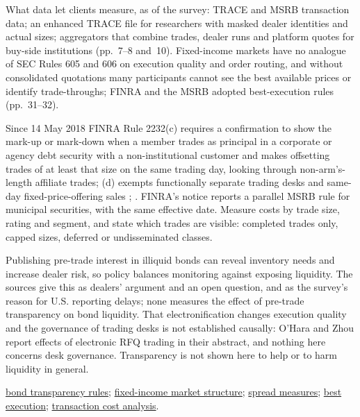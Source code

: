 \begin{qfevidence}
 What data let clients measure, as of the survey: TRACE and MSRB transaction data; an enhanced TRACE file for researchers with masked dealer identities and actual sizes; aggregators that combine trades, dealer runs and platform quotes for buy-side institutions (pp.~7--8 and~10). Fixed-income markets have no analogue of SEC Rules 605 and 606 on execution quality and order routing, and without consolidated quotations many participants cannot see the best available prices or identify trade-throughs; FINRA and the MSRB adopted best-execution rules (pp.~31--32).

Since 14 May 2018 FINRA Rule 2232(c) requires a confirmation to show the mark-up or mark-down when a member trades as principal in a corporate or agency debt security with a non-institutional customer and makes offsetting trades of at least that size on the same trading day, looking through non-arm's-length affiliate trades; (d) exempts functionally separate trading desks and same-day fixed-price-offering sales \citep[paras.~(c)--(f)]{finra-rule-2232}; \citep[effective date and MSRB paragraph]{finra-rn-17-08}. FINRA's notice reports a parallel MSRB rule for municipal securities, with the same effective date. Measure costs by trade size, rating and segment, and state which trades are visible: completed trades only, capped sizes, deferred or undisseminated classes.

 Publishing pre-trade interest in illiquid bonds can reveal inventory needs and increase dealer risk, so policy balances monitoring against exposing liquidity. The sources give this as dealers' argument and an open question, and as the survey's reason for U.S. reporting delays; none measures the effect of pre-trade transparency on bond liquidity. That electronification changes execution quality and the governance of trading desks is not established causally: O'Hara and Zhou report effects of electronic RFQ trading in their abstract, and nothing here concerns desk governance. Transparency is not shown here to help or to harm liquidity in general.

 \hyperref[rule:us-eu-bond-transparency]{bond transparency rules}; \hyperref[def:fixed-income-market-structure]{fixed-income market structure}; \hyperref[def:spread-measures]{spread measures}; \hyperref[def:best-execution]{best execution}; \hyperref[meth:transaction-cost-analysis]{transaction cost analysis}.

\end{qfevidence}

